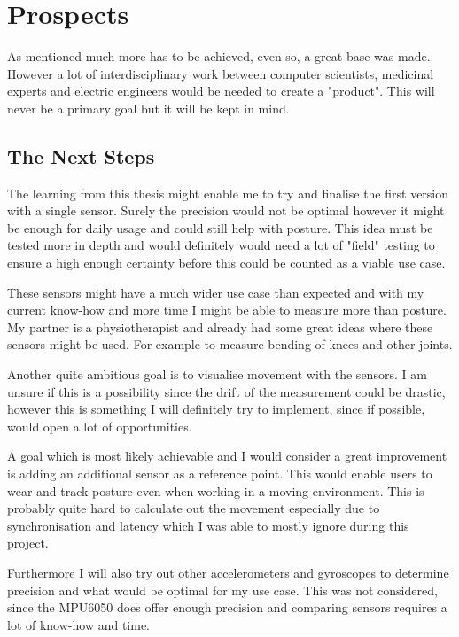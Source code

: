 \chapter*{Prospects}
\label{chap:Porspects}
\setcounter{section}{0}

As mentioned much more has to be achieved, even so, a great base was made. However a lot of interdisciplinary work between computer scientists, medicinal experts and electric engineers would be needed to create a "product". This will never be a primary goal but it will be kept in mind.

\section{The Next Steps}

The learning from this thesis might enable me to try and finalise the first version with a single sensor. Surely the precision would not be optimal however it might be enough for daily usage and could still help with posture.
This idea must be tested more in depth and would definitely would need a lot of "field" testing to ensure a high enough certainty before this could be counted as a viable use case. 

These sensors might have a much wider use case than expected and with my current know-how and more time I might be able to measure more than posture. My partner is a physiotherapist and already had some great ideas where these sensors might be used. For example to measure bending of knees and other joints. 

Another quite ambitious goal is to visualise movement with the sensors. I am unsure if this is a possibility since the drift of the measurement could be drastic, however this is something I will definitely try to implement, since if possible, would open a lot of opportunities.

A goal which is most likely achievable and I would consider a great improvement is adding an additional sensor as a reference point. This would enable users to wear and track posture even when working in a moving environment. This is probably quite hard to calculate out the movement especially due to synchronisation and latency which I was able to mostly ignore during this project.

Furthermore I will also try out other accelerometers and gyroscopes to determine precision and what would be optimal for my use case. This was not considered, since the MPU6050 does offer enough precision and comparing sensors requires a lot of know-how and time.